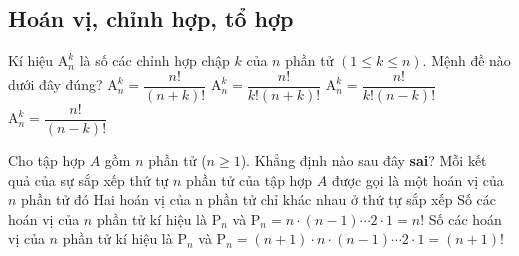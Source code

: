 \subsection{Hoán vị, chỉnh hợp, tổ hợp}
\begin{ex}%
	Kí hiệu $\mathrm{A}_n^k$ là số các chỉnh hợp chập $k$ của $n$ phần tử $(1\le k\le n)$. Mệnh đề nào dưới đây đúng?
	\choice
	{$\mathrm{A}_n^k=\dfrac{n!}{(n+k)!}$}
	{$\mathrm{A}_n^k=\dfrac{n!}{k!(n+k)!}$}
	{$\mathrm{A}_n^k=\dfrac{n!}{k!(n-k)!}$}
	{\True $\mathrm{A}_n^k=\dfrac{n!}{(n-k)!}$}
\end{ex}
\begin{ex}%
	Cho tập hợp $ A $ gồm $ n $ phần tử ($ n\ge 1 $). Khẳng định nào sau đây \textbf{sai}?
	\choice
	{Mỗi kết quả của sự sắp xếp thứ tự $ n $ phần tử của tập hợp $ A$ được gọi là một hoán vị của $ n $ phần tử đó}
	{Hai hoán vị của n phần tử chỉ khác nhau ở thứ tự sắp xếp}
	{Số các hoán vị của $ n $ phần tử kí hiệu là $\mathrm{ P}_n$ và $ \mathrm{ P}_n=n\cdot (n-1)\cdots 2\cdot1 =n!$}
	{\True Số các hoán vị của $ n $ phần tử kí hiệu là $ \mathrm{ P}_n$ và $ \mathrm{ P}_n=(n+1)\cdot n\cdot (n-1)\cdots 2\cdot1 =(n+1)!$}
\end{ex}

